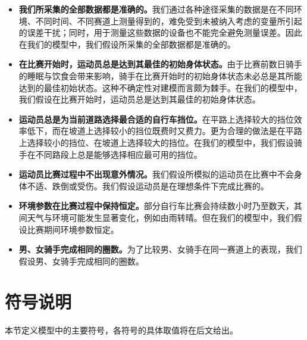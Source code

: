 \documentclass[11pt,a4paper]{ctexart}
\begin{document}
\begin{itemize}
\item \textbf{我们所采集的全部数据都是准确的。}我们通过各种途径采集的数据是在不同环境、不同时间、不同赛道上测量得到的，难免受到未被纳入考虑的变量所引起的误差干扰；同时，用于测量这些数据的设备也不能完全避免测量误差。因此在我们的模型中，我们假设所采集的全部数据都是准确的。
\item \textbf{在比赛开始时，运动员总是达到其最佳的初始身体状态。}由于比赛前数日骑手的睡眠与饮食会带来影响，骑手在比赛开始时的初始身体状态未必总是其所能达到的最佳初始状态。这种不确定性对建模而言颇为棘手。在我们的模型中，我们假设在比赛开始时，运动员总是达到其最佳的初始身体状态。
\item \textbf{运动员总是为当前道路选择最合适的自行车挡位。}在平路上选择较大的挡位效率低下，而在坡道上选择较小的挡位既费时又费力。更为合理的做法是在平路上选择较小的挡位、在坡道上选择较大的挡位。在我们的模型中，我们假设骑手在不同路段上总是能够选择相应最可用的挡位。
\item \textbf{运动员比赛过程中不出现意外情况。}我们假设所模拟的运动员在比赛中不会身体不适、跌倒或受伤。我们假设运动员是在理想条件下完成比赛的。
\item \textbf{环境参数在比赛过程中保持恒定。}部分自行车比赛会持续数小时乃至数天，其间天气与环境可能发生显著变化，例如由雨转晴。但在我们的模型中，我们假设比赛期间环境参数恒定。
\item \textbf{男、女骑手完成相同的圈数。}为了比较男、女骑手在同一赛道上的表现，我们假设男、女骑手完成相同的圈数。
\end{itemize}

\section{符号说明}

本节定义模型中的主要符号，各符号的具体取值将在后文给出。
\end{document}
